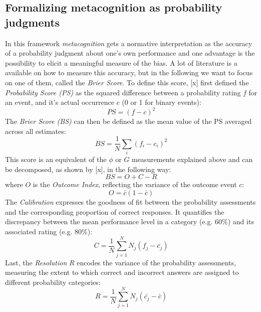 \documentclass[../main/main.tex]{subfiles}
\begin{document}
	\subsection{Formalizing metacognition as probability judgments}
	
	In this framework \textit{metacognition} gets a normative interpretation as the accuracy of a probability judgment about one's own performance and one advantage is the possibility to elicit a meaningful measure of the bias. A lot of literature is a available on how to measure this accuracy, but in the following we want to focus on one of them, called the \textit{Brier Score}. To define this score, [x] first defined the \textit{Probability Score (PS)} as the squared difference between a probability rating $f$ for an event, and it's actual occurrence $c$ (0 or 1 for binary events):
	\begin{displaymath}
			PS = (f - c)^2
	\end{displaymath}
	The \textit{Brier Score (BS)} can then be defined as the mean value of the PS averaged across all estimates:
	\begin{displaymath}
			BS = \frac{1}{N}\sum_i(f_i - c_i)^2
	\end{displaymath}
	This score is an equivalent of the $\phi$ or $G$ measurements explained above and can be decomposed, as shown by [x], in the following way:
	\begin{displaymath}
		BS = O + C - R
	\end{displaymath}
	where $O$ is the \textit{Outcome Index}, reflecting the variance of the outcome event $c$:
	\begin{displaymath}
		O = \bar{c}(1-\bar{c})
	\end{displaymath}
	The \textit{Calibration} expresses the goodness of fit between the probability assessments and the corresponding proportion of correct responses. It quantifies the discrepancy between the mean performance level in a category (e.g. $60\%$) and its associated rating (e.g. $80\%$):
	\begin{displaymath}
		C = \frac{1}{N}\sum_{j=1}^{N}N_j(f_j - \bar{c_j})
	\end{displaymath}
	Last, the \textit{Resolution} $R$ encodes the variance of the probability assessments, measuring the extent to which correct and incorrect answers are assigned to different probability categories:
	\begin{displaymath}
		R = \frac{1}{N}\sum_{j=1}^{N}N_j(\bar{c_j} - \bar{c})
	\end{displaymath}
\end{document}
